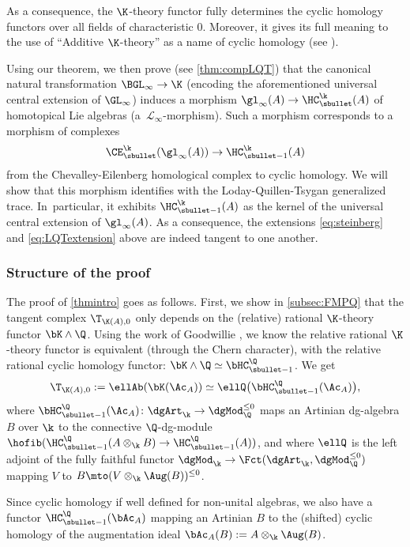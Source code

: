 As a consequence, the $\K$-theory functor fully determines the cyclic homology functors over all fields of characteristic $0$.
Moreover, it gives its full meaning to the use of ``Additive $\K$-theory'' as a name of cyclic homology (see \cite{feigintsygan:addK}).

Using our theorem, we then prove (see \autoref{thm:compLQT}) that the canonical natural transformation $\BGL_\infty \to \K$ (encoding the aforementioned universal central extension of $\GL_\infty$) induces a morphism $\gl_\infty(A) \to \HC_\sbullet^\k(A)$ of homotopical Lie algebras (\ie a~$\mathcal L_\infty$-morphism). Such a morphism corresponds to a morphism of complexes
\[
\CE_\sbullet^{\k}(\gl_\infty(A)) \to \HC_{\sbullet-1}^\k(A)
\]
from the Chevalley-Eilenberg homological complex to cyclic homology. We will show that this morphism identifies with the Loday-Quillen-Tsygan generalized trace. In~particular, it exhibits $\HC_{\sbullet - 1}^\k(A)$ as the kernel of the universal central extension of $\gl_\infty(A)$.
As a consequence, the extensions \eqref{eq:steinberg} and \eqref{eq:LQTextension} above are indeed tangent to one another.

\subsubsection*{Structure of the proof}
The proof of \autoref{thmintro} goes as follows. First, we show in \autoref{subsec:FMPQ} that the tangent complex $\T_{\K(A),0}$ only depends on the (relative) rational $\K$-theory functor $\bK \wedge \Q$.
Using the work of Goodwillie \cite{goodwillie:tangentk}, we know the relative rational
$\K$-theory functor is equivalent (through the Chern character), with the relative rational cyclic homology functor: $\bK \wedge \Q \simeq \bHC_{\sbullet-1}^\Q$.
We get
\[
\T_{\K(A),0} := \ellAb(\bK(\Ac_A)) \simeq \ellQ\bigl(\bHC_{\sbullet -1}^\Q(\Ac_A)\bigr),
\]
where $\bHC^\Q_{\sbullet-1}(\Ac_A) \colon \dgArt_\k \to \dgMod_\Q^{\leq 0}$ maps an Artinian dg-algebra $B$ over $\k$ to the connective $\Q$-dg-module $\hofib(\HC_{\sbullet -1}^\Q(A \otimes_\k B) \to \HC_{\sbullet -1}^\Q(A))$, and where $\ellQ$ is the left adjoint of the fully faithful functor $\dgMod_\k \to \Fct(\dgArt_\k,\dgMod_\Q^{\leq 0})$ mapping $V$ to $B \mto (V \otimes_\k \Aug(B)) ^{\leq 0}$.

Since cyclic homology if well defined for non-unital algebras, we also have a functor $\HC_{\sbullet-1}^\Q(\bAc_A)$ mapping an Artinian $B$ to the (shifted) cyclic homology of the augmentation ideal $\bAc_A(B) := A \otimes_\k \Aug(B)$.

